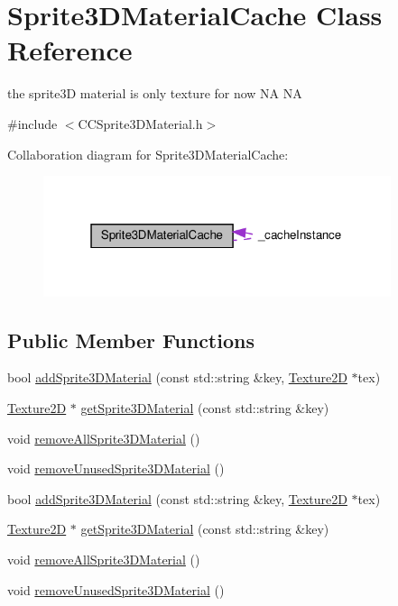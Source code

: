 \hypertarget{classSprite3DMaterialCache}{}\section{Sprite3\+D\+Material\+Cache Class Reference}
\label{classSprite3DMaterialCache}


the sprite3D material is only texture for now  NA  NA  




{\ttfamily \#include $<$C\+C\+Sprite3\+D\+Material.\+h$>$}



Collaboration diagram for Sprite3\+D\+Material\+Cache\+:
\nopagebreak
\begin{figure}[H]
\begin{center}
\leavevmode
\includegraphics[width=289pt]{classSprite3DMaterialCache__coll__graph}
\end{center}
\end{figure}
\subsection*{Public Member Functions}
\begin{DoxyCompactItemize}
\item 
bool \hyperlink{classSprite3DMaterialCache_a586f31f18ba69ebbd89663ce02dcb903}{add\+Sprite3\+D\+Material} (const std\+::string \&key, \hyperlink{classTexture2D}{Texture2D} $\ast$tex)
\item 
\hyperlink{classTexture2D}{Texture2D} $\ast$ \hyperlink{classSprite3DMaterialCache_ab6ad106f7b9140a0e9d2d2e73747481f}{get\+Sprite3\+D\+Material} (const std\+::string \&key)
\item 
void \hyperlink{classSprite3DMaterialCache_a8a004363b163bbfc77ec1a28f9e29ee6}{remove\+All\+Sprite3\+D\+Material} ()
\item 
void \hyperlink{classSprite3DMaterialCache_a144c544a18b5483de07a2d8444d063df}{remove\+Unused\+Sprite3\+D\+Material} ()
\item 
bool \hyperlink{classSprite3DMaterialCache_a586f31f18ba69ebbd89663ce02dcb903}{add\+Sprite3\+D\+Material} (const std\+::string \&key, \hyperlink{classTexture2D}{Texture2D} $\ast$tex)
\item 
\hyperlink{classTexture2D}{Texture2D} $\ast$ \hyperlink{classSprite3DMaterialCache_a318603318799ff0dd6a3273db01dde16}{get\+Sprite3\+D\+Material} (const std\+::string \&key)
\item 
void \hyperlink{classSprite3DMaterialCache_a8a004363b163bbfc77ec1a28f9e29ee6}{remove\+All\+Sprite3\+D\+Material} ()
\item 
void \hyperlink{classSprite3DMaterialCache_a144c544a18b5483de07a2d8444d063df}{remove\+Unused\+Sprite3\+D\+Material} ()
\end{DoxyCompactItemize}
